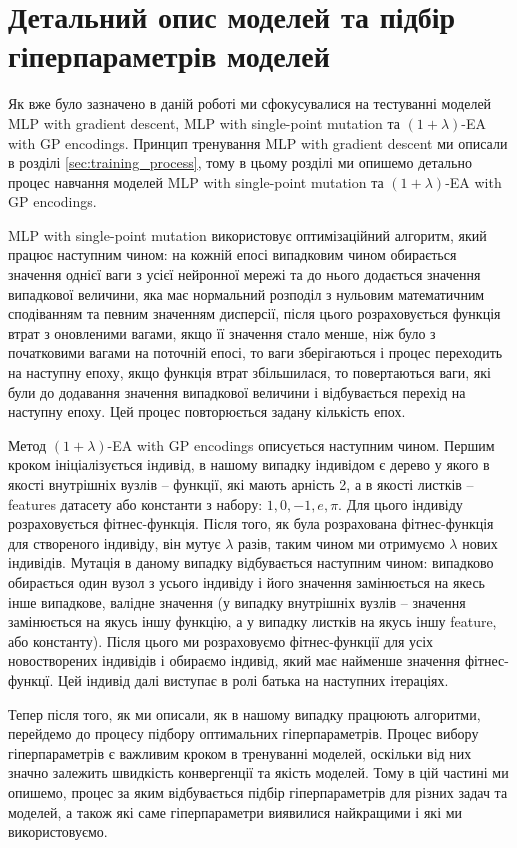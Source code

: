 \section{Детальний опис моделей та підбір гіперпараметрів моделей}

Як вже було зазначено в даній роботі ми сфокусувалися на тестуванні моделей MLP with gradient descent, MLP with single-point mutation та $(1+\lambda)$-EA with GP encodings. Принцип тренування MLP with gradient descent ми описали в розділі \ref{sec:training_process}, тому в цьому розділі ми опишемо детально процес навчання моделей MLP with single-point mutation та $(1+\lambda)$-EA with GP encodings.

MLP with single-point mutation використовує оптимізаційний алгоритм, який працює наступним чином: на кожній епосі випадковим чином обирається значення однієї ваги з усієї нейронної мережі та до нього додається значення випадкової величини, яка має нормальний розподіл з нульовим математичним сподіванням та певним значенням дисперсії, після цього розраховується функція втрат з оновленими вагами, якщо її значення стало менше, ніж було з початковими вагами на поточній епосі, то ваги зберігаються і процес переходить на наступну епоху, якщо функція втрат збільшилася, то повертаються ваги, які були до додавання значення випадкової величини і відбувається перехід на наступну епоху. Цей процес повторюється задану кількість епох.

Метод $(1+\lambda)$-EA with GP encodings описується наступним чином. Першим кроком ініціалізується індивід, в нашому випадку індивідом є дерево у якого в якості внутрішніх вузлів -- функції, які мають арність 2, а в якості листків -- features датасету або константи з набору: $1, 0, -1, e, \pi$. Для цього індивіду розраховується фітнес-функція. Після того, як була розрахована фітнес-функція для створеного індивіду, він мутує $\lambda$ разів, таким чином ми отримуємо $\lambda$ нових індивідів. Мутація в даному випадку відбувається наступним чином: випадково обирається один вузол з усього індивіду і його значення замінюється на якесь інше випадкове, валідне значення (у випадку внутрішніх вузлів -- значення замінюється на якусь іншу функцію, а у випадку листків на якусь іншу feature, або константу).  Після цього ми розраховуємо фітнес-функції для усіх новостворених індивідів і обираємо індивід, який має найменше значення фітнес-функцї. Цей індивід далі виступає в ролі батька на наступних ітераціях.

Тепер після того, як ми описали, як в нашому випадку працюють алгоритми, перейдемо до процесу підбору оптимальних гіперпараметрів. Процес вибору гіперпараметрів є важливим кроком в тренуванні моделей, оскільки від них значно залежить швидкість конвергенції та якість моделей. Тому в цій частині ми опишемо, процес за яким відбувається підбір гіперпараметрів для різних задач та моделей, а також які саме гіперпараметри виявилися найкращими і які ми використовуємо.

